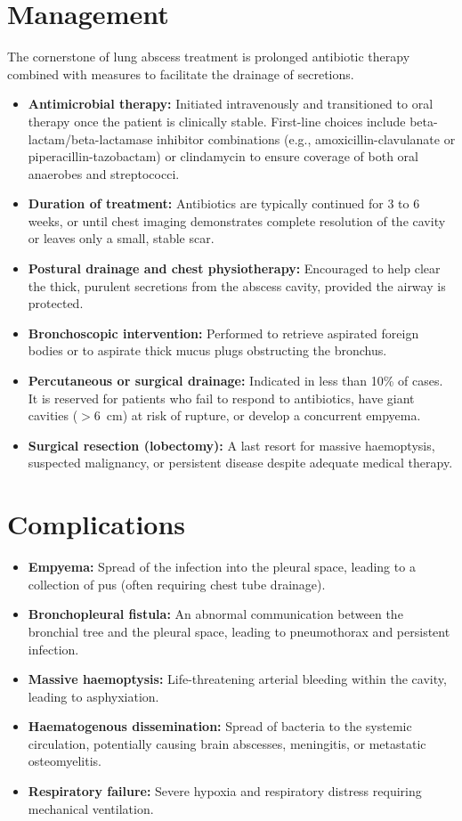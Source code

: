 \section*{Management}
The cornerstone of lung abscess treatment is prolonged antibiotic therapy combined with measures to facilitate the drainage of secretions.
\begin{itemize}
    \item \textbf{Antimicrobial therapy:} Initiated intravenously and transitioned to oral therapy once the patient is clinically stable. First-line choices include beta-lactam/beta-lactamase inhibitor combinations (e.g., amoxicillin-clavulanate or piperacillin-tazobactam) or clindamycin to ensure coverage of both oral anaerobes and streptococci.
    \item \textbf{Duration of treatment:} Antibiotics are typically continued for 3 to 6 weeks, or until chest imaging demonstrates complete resolution of the cavity or leaves only a small, stable scar.
    \item \textbf{Postural drainage and chest physiotherapy:} Encouraged to help clear the thick, purulent secretions from the abscess cavity, provided the airway is protected.
    \item \textbf{Bronchoscopic intervention:} Performed to retrieve aspirated foreign bodies or to aspirate thick mucus plugs obstructing the bronchus.
    \item \textbf{Percutaneous or surgical drainage:} Indicated in less than 10\% of cases. It is reserved for patients who fail to respond to antibiotics, have giant cavities ($> 6$~cm) at risk of rupture, or develop a concurrent empyema.
    \item \textbf{Surgical resection (lobectomy):} A last resort for massive haemoptysis, suspected malignancy, or persistent disease despite adequate medical therapy.
\end{itemize}

\section*{Complications}
\begin{itemize}
    \item \textbf{Empyema:} Spread of the infection into the pleural space, leading to a collection of pus (often requiring chest tube drainage).
    \item \textbf{Bronchopleural fistula:} An abnormal communication between the bronchial tree and the pleural space, leading to pneumothorax and persistent infection.
    \item \textbf{Massive haemoptysis:} Life-threatening arterial bleeding within the cavity, leading to asphyxiation.
    \item \textbf{Haematogenous dissemination:} Spread of bacteria to the systemic circulation, potentially causing brain abscesses, meningitis, or metastatic osteomyelitis.
    \item \textbf{Respiratory failure:} Severe hypoxia and respiratory distress requiring mechanical ventilation.
\end{itemize}

